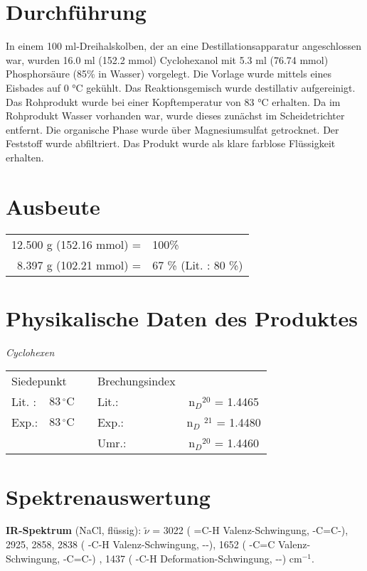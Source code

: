 \documentclass[12pt]{article}
\begin{document}
\begin{onehalfspace}
\section{Durchführung\cite{organikum}} 
In einem 100 ml-Dreihalskolben, der an eine Destillationsapparatur angeschlossen war, wurden 16.0 ml (152.2 mmol) Cyclohexanol mit 5.3 ml (76.74 mmol) Phosphorsäure (85\% in Wasser) vorgelegt. 
Die Vorlage wurde mittels eines Eisbades auf 0 \si{\celsius} gekühlt. Das Reaktionsgemisch wurde destillativ aufgereinigt. Das Rohprodukt wurde bei einer Kopftemperatur von 83 \si{\celsius} erhalten.
Da im Rohprodukt Wasser vorhanden war, wurde dieses zunächst im Scheidetrichter entfernt. Die organische Phase wurde über Magnesiumsulfat getrocknet. Der Feststoff wurde abfiltriert. Das Produkt wurde als klare farblose Flüssigkeit erhalten.


\section{Ausbeute} 
\begin{tabular}{ rl}
 12.500 g (152.16 mmol) =  & 100\%\\
  8.397 g (102.21 mmol) =  & 67 \% (Lit.\cite{organikum} : 80 \%)   \\
 \end{tabular}


\section{Physikalische Daten des Produktes} 
\textit{Cyclohexen} \\[0.2cm]
\begin{tabular}{ lrclc }
 \multicolumn{2}{l}{Siedepunkt} & & Brechungsindex  \\
   Lit. \cite{organikum} : & $ 83 \,^{\circ}\mathrm{C} $ & & Lit.\cite{organikum}: & n$_{D}$$^{20}$ = 1.4465  \\
   Exp.:               & $ 83 \,^{\circ}\mathrm{C} $ & & Exp.: & n$_{D}$ $^{21}$ = 1.4480 \\
    & & & Umr.: & n$_{D}$$^{20}$ = 1.4460 \\  
  \end{tabular}
\section{Spektrenauswertung} 
\textbf{IR-Spektrum} (NaCl, flüssig): $\tilde{\nu}$ = 3022 ( =C-H Valenz-Schwingung, -C=C-),
2925, 2858, 2838 ( -C-H Valenz-Schwingung, --), 1652 ( -C=C Valenz-Schwingung, -C=C-) , 1437 ( -C-H Deformation-Schwingung, --) cm$^{-1}$.\\


\end{onehalfspace}
\end{document}
